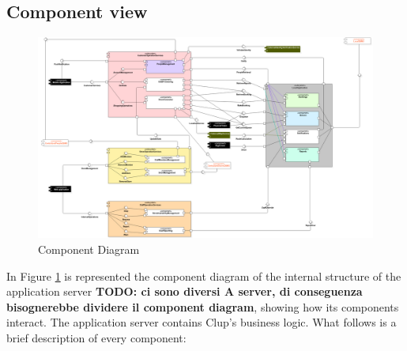 \subsection{Component view}
\begin{figure}[h!]
	\includegraphics[width=\linewidth]{../Diagrams/ComponentDiagram.png}
	\caption{Component Diagram}
	\label{fig:CompDgm}
\end{figure}
In Figure \ref{fig:CompDgm} is represented the component diagram of the
internal structure of the application server \textbf{TODO: ci sono diversi A server, di conseguenza bisognerebbe dividere il component diagram}, showing how its components interact. The application server
contains Clup's business logic. What follows is a brief description of every component:

